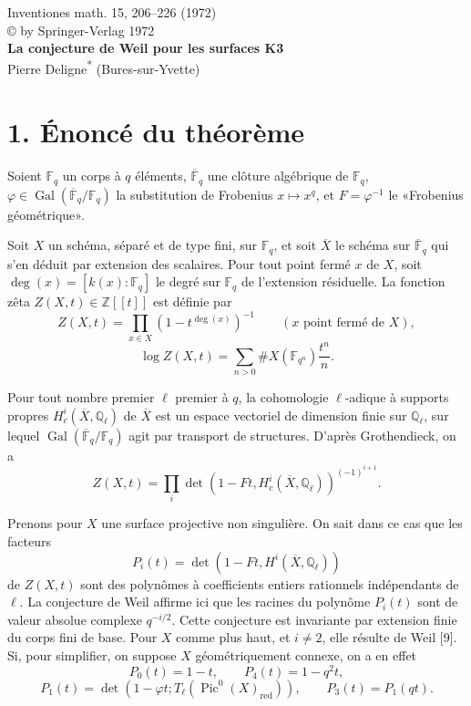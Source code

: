 \documentclass[10pt]{article}
\newcommand{\F}{\mathbb{F}}
\newcommand{\Z}{\mathbb{Z}}
\newcommand{\Ql}{\mathbb{Q}_\ell}
\newcommand{\Fp}{\mathbb{F}_q}
\newcommand{\Gal}{\operatorname{Gal}}
\newcommand{\Pic}{\operatorname{Pic}}
\begin{document}
\begin{center}
{\large Inventiones math. 15, 206--226 (1972)}\\
{\small \copyright{} by Springer-Verlag 1972}\\[3.0em]
{\Large\bfseries La conjecture de Weil pour les surfaces K3}\\[1.5em]
{Pierre Deligne\textsuperscript{*} (Bures-sur-Yvette)}
\end{center}

\section*{1. Énoncé du théorème}

Soient $\Fp$ un corps à $q$ éléments, $\overline{\F}_q$ une clôture algébrique de $\Fp$, $\varphi\in\Gal(\overline{\F}_q/\Fp)$ la substitution de Frobenius $x\mapsto x^q$, et $F=\varphi^{-1}$ le «Frobenius géométrique».

Soit $X$ un schéma, séparé et de type fini, sur $\Fp$, et soit $\overline X$ le schéma sur $\overline{\F}_q$ qui s'en déduit par extension des scalaires. Pour tout point fermé $x$ de $X$, soit $\deg(x)=[k(x):\Fp]$ le degré sur $\Fp$ de l'extension résiduelle. La fonction zêta $Z(X,t)\in\Z[[t]]$ est définie par
\[
Z(X,t)=\prod_{x\in X}(1-t^{\deg(x)})^{-1}\qquad(x\text{ point fermé de }X),
\]
\[
\log Z(X,t)=\sum_{n>0}\#X(\F_{q^n})\frac{t^n}{n}.
\]

Pour tout nombre premier $\ell$ premier à $q$, la cohomologie $\ell$-adique à supports propres $H_c^i(\overline X,\Ql)$ de $\overline X$ est un espace vectoriel de dimension finie sur $\Ql$, sur lequel $\Gal(\overline{\F}_q/\Fp)$ agit par transport de structures. D'après Grothendieck, on a
\[
Z(X,t)=\prod_i\det(1-Ft,H_c^i(\overline X,\Ql))^{(-1)^{i+1}}.
\]

Prenons pour $X$ une surface projective non singulière. On sait dans ce cas que les facteurs
\[
P_i(t)=\det(1-Ft,H^i(\overline X,\Ql))
\]
de $Z(X,t)$ sont des polynômes à coefficients entiers rationnels indépendants de $\ell$. La conjecture de Weil affirme ici que les racines du polynôme $P_i(t)$ sont de valeur absolue complexe $q^{-i/2}$. Cette conjecture est invariante par extension finie du corps fini de base. Pour $X$ comme plus haut, et $i\ne2$, elle résulte de Weil [9]. Si, pour simplifier, on suppose $X$ géométriquement connexe, on a en effet
\[
P_0(t)=1-t,
\qquad
P_4(t)=1-q^2t,
\]
\[
P_1(t)=\det(1-\varphi t;T_\ell(\Pic^0(X)_{\mathrm{red}})),
\qquad
P_3(t)=P_1(qt).
\]
\end{document}
